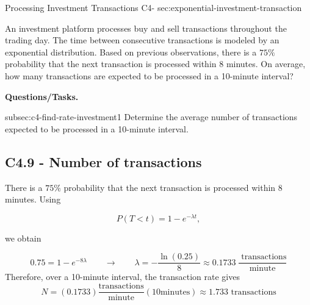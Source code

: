 	
	\sectionScored
	{Processing Investment Transactions}
	{C4-}
	{sec:exponential-investment-transaction}
	{
		An investment platform processes buy and sell transactions throughout
		the trading day. The time between consecutive transactions is modeled
		by an exponential distribution. Based on previous observations, there
		is a \(75\%\) probability that the next transaction is processed within
		8 minutes. On average, how many transactions are expected to be
		processed in a 10-minute interval?
		
		\textbf{Questions/Tasks.}
		\begin{enumerate}
			\CriterionTask
			{subsec:c4-find-rate-investment}{1}
			{Determine the average number of transactions expected to be
				processed in a 10-minute interval.
				}
		\end{enumerate}
		
		\subsection*{C4.9 - Number of transactions}
		\label{subsec:c4-find-rate-investment}
		
		There is a \(75\%\) probability that the next transaction is processed
		within 8 minutes. Using
		
		$$
		P(T<t)=1-e^{-\lambda t},
		$$
		
		we obtain
		
		$$
		0.75=1-e^{-8\lambda}
		\qquad \longrightarrow \qquad
		\lambda=-\frac{\ln(0.25)}{8}
		\approx0.1733 \>\frac{\text{ transactions}}{\text{minute}}
		$$
		Therefore, over a 10-minute interval, the transaction rate gives
		$$
		N=(0.1733)\frac{\text{transactions}}{\text{minute}}(10\text{minutes})
		\approx \boxed{1.733\text{ transactions}}
		$$
		
	}
	
